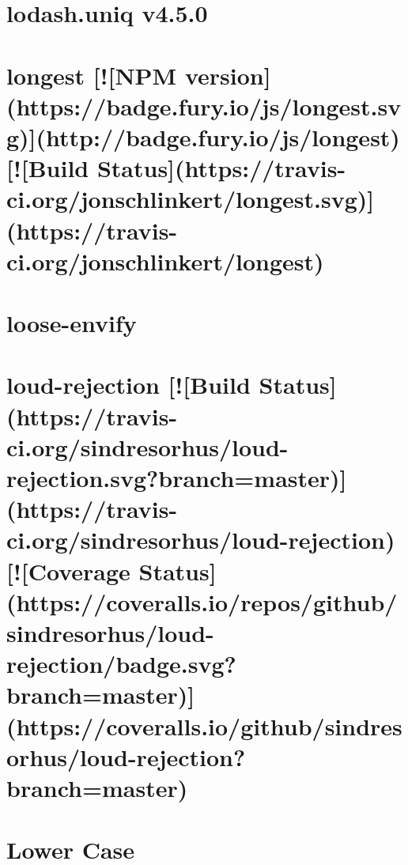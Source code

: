 \documentclass[twoside]{book}
\newcommand{\+}{\discretionary{\mbox{\scriptsize$\hookleftarrow$}}{}{}}
\begin{document}
\chapter{lodash.\+uniq v4.5.0}
\label{md__c_1_workspace_demo_src_main_script_node_modules_lodash_8uniq__r_e_a_d_m_e}

\chapter{longest \mbox{[}!\mbox{[}N\+PM version\mbox{]}(https\+://badge.fury.\+io/js/longest.svg)\mbox{]}(http\+://badge.fury.\+io/js/longest) \mbox{[}!\mbox{[}Build Status\mbox{]}(https\+://travis-\/ci.org/jonschlinkert/longest.svg)\mbox{]}(https\+://travis-\/ci.org/jonschlinkert/longest)}
\label{md__c_1_workspace_demo_src_main_script_node_modules_longest__r_e_a_d_m_e}

\chapter{loose-\/envify}
\label{md__c_1_workspace_demo_src_main_script_node_modules_loose-envify__r_e_a_d_m_e}

\chapter{loud-\/rejection \mbox{[}!\mbox{[}Build Status\mbox{]}(https\+://travis-\/ci.org/sindresorhus/loud-\/rejection.svg?branch=master)\mbox{]}(https\+://travis-\/ci.org/sindresorhus/loud-\/rejection) \mbox{[}!\mbox{[}Coverage Status\mbox{]}(https\+://coveralls.io/repos/github/sindresorhus/loud-\/rejection/badge.svg?branch=master)\mbox{]}(https\+://coveralls.io/github/sindresorhus/loud-\/rejection?branch=master)}
\label{md__c_1_workspace_demo_src_main_script_node_modules_loud-rejection_readme}

\chapter{Lower Case}
\label{md__c_1_workspace_demo_src_main_script_node_modules_lower-case__r_e_a_d_m_e}

\end{document}
